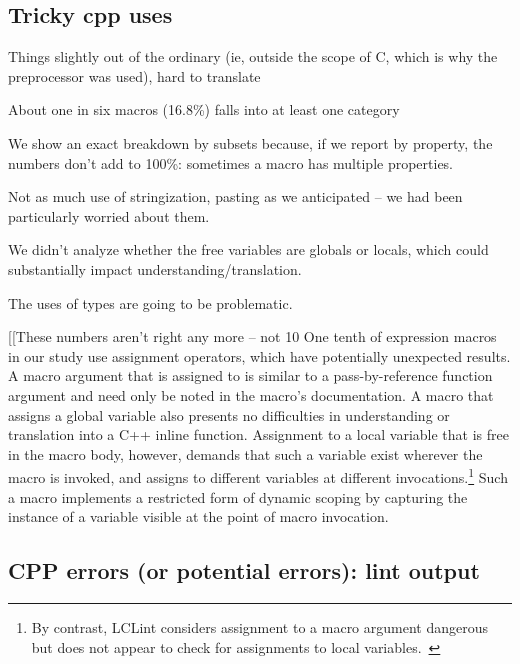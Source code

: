 \documentclass[10pt]{article}
\begin{document}



\subsection{Tricky cpp uses}

Things slightly out of the ordinary (ie, outside the
          scope of C, which is why the preprocessor was used), hard to translate

{}

{}

        About one in six macros (16.8\%) falls into at least one category

        We show an exact breakdown by subsets because, if we report by
          property, the numbers don't add to 100\%: sometimes a macro has
          multiple properties.

        Not as much use of stringization, pasting as we anticipated -- we
          had been particularly worried about them.

        We didn't analyze whether the free variables are globals or locals,
          which could substantially impact understanding/translation.

        The uses of types are going to be problematic.

[[These numbers aren't right any more -- not 10%
One tenth of expression macros in our study use assignment operators, which
have potentially unexpected results.  A macro argument that is assigned to
is similar to a pass-by-reference function argument and need only be noted in the
macro's documentation.  A macro that assigns a global variable also
presents no difficulties in understanding or translation into a C++
inline function.
Assignment to a local variable that is free in the macro body, however,
demands that such a variable exist wherever the macro is invoked, and
assigns to different variables at different invocations.\footnote{By
  contrast, LCLint considers assignment to a macro argument dangerous but
  does not appear to check for assignments to local
  variables.~\cite{Evans:LCLint}} Such a macro implements a restricted form
of dynamic scoping by capturing the instance of a variable visible at
the point of macro invocation.


\subsection{CPP errors (or potential errors): lint output}
\end{document}
